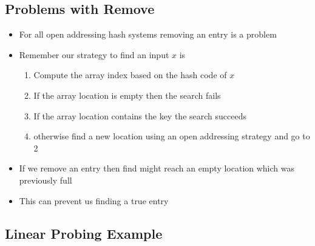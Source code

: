 
\begin{slide}
\section[-1]{Problems with Remove}

\begin{PauseHighLight}
  \begin{itemize}
  \item For all open addressing hash systems removing an entry is a
    problem\pause
  \item Remember our strategy to find an input $x$ is\pause
    \begin{enumerate}
    \item Compute the array index based on the hash code of $x$\pause
    \item If the array location is empty then the search fails\pause
    \item If the array location contains the key the search succeeds\pause
    \item otherwise find a new location using an open addressing strategy
      and go to 2\pause
    \end{enumerate}
  \item If we remove an entry then find might reach an empty location
    which was previously full\pause
  \item This can prevent us finding a true entry\pause
  \end{itemize}
\end{PauseHighLight}

\end{slide}


\begin{slide}
\section{Linear Probing Example}

\pausebuild
\begin{center}
  \pause
\end{center}
\end{slide}


